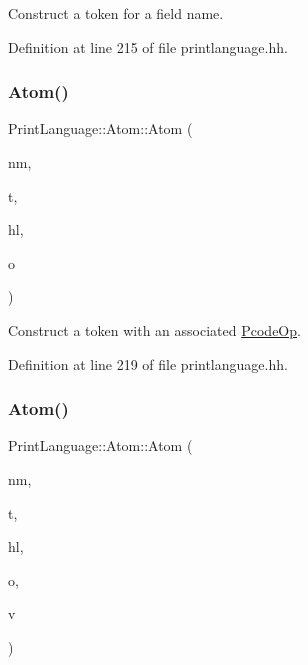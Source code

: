 Construct a token for a field name. 



Definition at line 215 of file printlanguage.\+hh.

\mbox{\label{struct_print_language_1_1_atom_a723f5f1e5dc9af9d9b5c8608cd9e8f79}} 
\subsubsection{\texorpdfstring{Atom()}{Atom()}\hspace{0.1cm}{\footnotesize\ttfamily [4/6]}}
{\footnotesize\ttfamily Print\+Language\+::\+Atom\+::\+Atom (\begin{DoxyParamCaption}\item[{const string \&}]{nm,  }\item[{\mbox{\hyperlink{class_print_language_a7102f70f47777d8b17af52c5157c473e}{tagtype}}}]{t,  }\item[{\mbox{\hyperlink{class_emit_xml_a7c3577436da429c3c75f4b82cac6864f}{Emit\+Xml\+::syntax\+\_\+highlight}}}]{hl,  }\item[{const \mbox{\hyperlink{class_pcode_op}{Pcode\+Op}} $\ast$}]{o }\end{DoxyParamCaption})\hspace{0.3cm}{\ttfamily [inline]}}



Construct a token with an associated \mbox{\hyperlink{class_pcode_op}{Pcode\+Op}}. 



Definition at line 219 of file printlanguage.\+hh.

\mbox{\label{struct_print_language_1_1_atom_ad94a0897a54ad3f3c30d6ad84c39964a}} 
\subsubsection{\texorpdfstring{Atom()}{Atom()}\hspace{0.1cm}{\footnotesize\ttfamily [5/6]}}
{\footnotesize\ttfamily Print\+Language\+::\+Atom\+::\+Atom (\begin{DoxyParamCaption}\item[{const string \&}]{nm,  }\item[{\mbox{\hyperlink{class_print_language_a7102f70f47777d8b17af52c5157c473e}{tagtype}}}]{t,  }\item[{\mbox{\hyperlink{class_emit_xml_a7c3577436da429c3c75f4b82cac6864f}{Emit\+Xml\+::syntax\+\_\+highlight}}}]{hl,  }\item[{const \mbox{\hyperlink{class_pcode_op}{Pcode\+Op}} $\ast$}]{o,  }\item[{const \mbox{\hyperlink{class_varnode}{Varnode}} $\ast$}]{v }\end{DoxyParamCaption})\hspace{0.3cm}{\ttfamily [inline]}}



